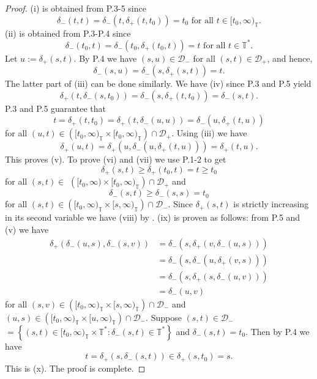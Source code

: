 \documentclass[b5paper,reqno]{amsart}\usepackage{amsfonts}
\theoremstyle{plain}
\numberwithin{equation}{section}
\begin{document}
\begin{proof}
(i) is obtained from P.3-5 since\[
\delta_{-}(t,t)=\delta_{-}(t,\delta_{+}(t,t_{0}))=t_{0}\text{ for all }t\in\lbrack t_{0},\infty
)_{\mathbb{T}}.
\]
(ii) is obtained from P.3-P.4 since\[
\delta_{-}(t_{0},t)=\delta_{-}(t_{0},\delta_{+}(t_{0},t))=t \text{ for all } t\in\mathbb{T}^{\ast}.
\]
Let $u:=\delta_{+}(s,t)$. By P.4 we have $(s,u)\in\mathcal{D}_{-}$ for all
$(s,t)\in\mathcal{D}_{+}$, and hence,\[
\delta_{-}(s,u)=\delta_{-}(s,\delta_{+}(s,t))=t.
\]
The latter part of (iii) can be done similarly. We have (iv) since P.3 and P.5
yield\[
\delta_{+}(t,\delta_{-}(s,t_{0}))=\delta_{-}(s,\delta_{+}(t,t_{0}))=\delta
_{-}(s,t).
\]
P.3 and P.5 guarantee that\[
t=\delta_{+}(t,t_{0})=\delta_{+}(t,\delta_{-}(u,u))=\delta_{-}(u,\delta
_{+}(t,u))
\]
for all $(u,t)\in\left(  \lbrack t_{0},\infty)_{\mathbb{T}}\times\lbrack
t_{0},\infty)_{\mathbb{T}}\right)  \cap\mathcal{D}_{+}$. Using (iii) we have\[
\delta_{+}(u,t)=\delta_{+}(u,\delta_{-}(u,\delta_{+}(t,u)))=\delta_{+}(t,u).
\]
This proves (v). To prove (vi) and (vii) we use P.1-2 to get\[
\delta_{+}(s,t)\geq\delta_{+}(t_{0},t)=t\geq t_{0}\]
for all $(s,t)\in$ $\left(  [t_{0},\infty)\times\lbrack t_{0},\infty
)_{\mathbb{T}}\right)  \cap\mathcal{D}_{+}$ and\[
\delta_{-}(s,t)\geq\delta_{-}(s,s)=t_{0}\]
for all $(s,t)\in\left(  \lbrack t_{0},\infty)_{\mathbb{T}}\times\lbrack
s,\infty)_{\mathbb{T}}\right)  \cap\mathcal{D}_{-}$. Since $\delta_{+}(s,t)$
is strictly increasing in its second variable we have (viii) by
\cite[Corollary 1.16]{book2}. (ix) is proven as follows: from P.5 and (v) we
have\begin{align*}
\delta_{+}(\delta_{-}(u,s),\delta_{-}(s,v))  &  =\delta_{-}(s,\delta
_{+}(v,\delta_{-}(u,s)))\\
&  =\delta_{-}(s,\delta_{-}(u,\delta_{+}(v,s)))\\
&  =\delta_{-}(s,\delta_{+}(s,\delta_{-}(u,v)))\\
&  =\delta_{-}(u,v)
\end{align*}
for all $(s,v)\in\left(  \lbrack t_{0},\infty)_{\mathbb{T}}\times\lbrack
s,\infty)_{\mathbb{T}}\right)  \cap\mathcal{D}_{-}$ and $(u,s)\in\left(
\lbrack t_{0},\infty)_{\mathbb{T}}\times\lbrack u,\infty)_{\mathbb{T}}\right)
\cap\mathcal{D}_{-}$. Suppose $(s,t)\in\mathcal{D}_{-}$ $=\left\{
(s,t)\in\lbrack t_{0},\infty)_{\mathbb{T}}\times\mathbb{T}^{\ast}:\delta
_{-}(s,t)\in\mathbb{T}^{\ast}\right\}  $ and $\delta_{-}(s,t)=t_{0}$. Then by
P.4 we have\[
t=\delta_{+}(s,\delta_{-}(s,t))\in\delta_{+}(s,t_{0})=s.
\]
This is (x). The proof is complete.
\end{proof}
\end{document}
